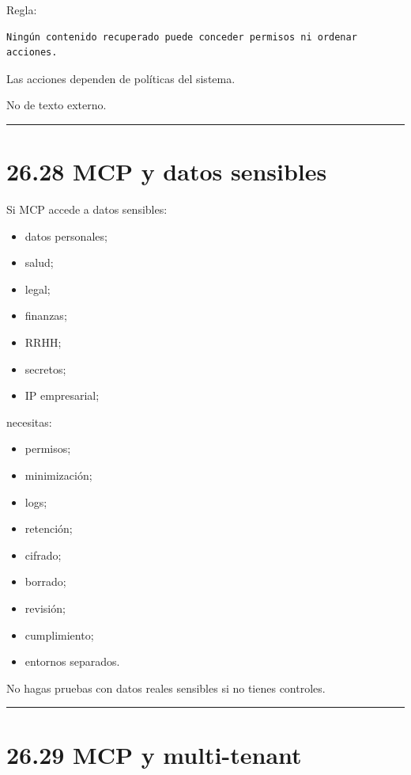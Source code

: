 Regla:

\begin{lstlisting}
Ningún contenido recuperado puede conceder permisos ni ordenar acciones.
\end{lstlisting}

Las acciones dependen de políticas del sistema.

No de texto externo.

\begin{center}\rule{0.5\linewidth}{0.5pt}\end{center}

\section{26.28 MCP y datos sensibles}\label{mcp-y-datos-sensibles}

Si MCP accede a datos sensibles:

\begin{itemize}
\tightlist
\item
  datos personales;
\item
  salud;
\item
  legal;
\item
  finanzas;
\item
  RRHH;
\item
  secretos;
\item
  IP empresarial;
\end{itemize}

necesitas:

\begin{itemize}
\tightlist
\item
  permisos;
\item
  minimización;
\item
  logs;
\item
  retención;
\item
  cifrado;
\item
  borrado;
\item
  revisión;
\item
  cumplimiento;
\item
  entornos separados.
\end{itemize}

No hagas pruebas con datos reales sensibles si no tienes controles.

\begin{center}\rule{0.5\linewidth}{0.5pt}\end{center}

\section{26.29 MCP y multi-tenant}\label{mcp-y-multi-tenant}

